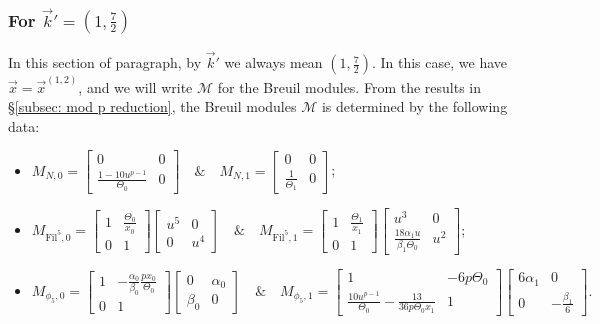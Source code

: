 \documentclass[11pt]{amsart}
\theoremstyle{definition}
\numberwithin{equation}{subsection}
\theoremstyle{plain}
\theoremstyle{plain}
\theoremstyle{plain}
\theoremstyle{plain}
\theoremstyle{plain}
\theoremstyle{plain}
\theoremstyle{plain}
\theoremstyle{plain}
\theoremstyle{plain}
\theoremstyle{plain}
\theoremstyle{plain}
\theoremstyle{plain}
\theoremstyle{definition}
\theoremstyle{definition}
\theoremstyle{definition}
\theoremstyle{remark}
\renewcommand{\(}{\textup{(}}
\renewcommand{\)}{\textup{)}}
\newcommand{\cM}{\mathcal{M}}
\newcommand{\Fil}{\mathrm{Fil}}
\newcommand{\vx}{\vec{x}}
\newcommand{\vk}{\vec{k}}
\begin{document}
\subsubsection{\textbf{For $\vk'=(1,\frac{7}{2})$}}\label{subsubsec: vr=(1,5), vk=(1,7/2)}
In this section of paragraph, by $\vk'$ we always mean $(1,\frac{7}{2})$. In this case, we have $\vx=\vx^{(1,2)}$, and we will write $\cM$ for the Breuil modules. From the results in \S\ref{subsec: mod p reduction}, the Breuil modules $\cM$ is determined by the following data:
\begin{itemize}[leftmargin=*]
  \item $M_{N,0}=
  \begin{bmatrix}
    0 & 0 \\
    \frac{1-10u^{p-1}}{\Theta_0} & 0
  \end{bmatrix}\quad\&\quad
  M_{N,1}=
  \begin{bmatrix}
    0 & 0 \\
    \frac{1}{\Theta_1} & 0
  \end{bmatrix}$;
  \item $M_{\Fil^5,0}=
  \begin{bmatrix}
    1 & \frac{\Theta_0}{x_0} \\
    0 & 1
  \end{bmatrix}
  \begin{bmatrix}
    u^5 & 0 \\
    0 & u^4
  \end{bmatrix}\quad\&\quad
  M_{\Fil^5,1}=
  \begin{bmatrix}
    1 & \frac{\Theta_1}{x_1} \\
    0 & 1
  \end{bmatrix}
  \begin{bmatrix}
    u^3 & 0 \\
    \frac{18\alpha_1u}{\beta_1\Theta_0} & u^2
  \end{bmatrix}$;
  \item $M_{\phi_5,0}=
  \begin{bmatrix}
    1 & -\frac{\alpha_0}{\beta_0}\frac{px_0}{\Theta_0} \\
    0 & 1
  \end{bmatrix}
  \begin{bmatrix}
    0 & \alpha_0 \\
    \beta_0 & 0
  \end{bmatrix}\quad\&\quad
  M_{\phi_5,1}=
  \begin{bmatrix}
    1 & -6p\Theta_0 \\
    \frac{10u^{p-1}}{\Theta_0} -\frac{13}{36p\Theta_0x_1} & 1
  \end{bmatrix}
  \begin{bmatrix}
    6\alpha_1 & 0 \\
    0 & -\frac{\beta_1}{6}
  \end{bmatrix}.$
\end{itemize}
\end{document}
